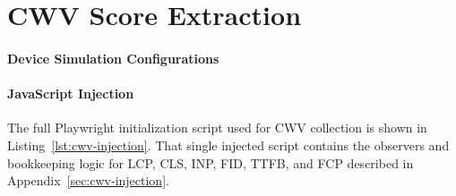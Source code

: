 \section{CWV Score Extraction}
\paragraph{Device Simulation Configurations}

\paragraph{JavaScript Injection}
The full Playwright initialization script used for CWV collection is shown in Listing~\ref{lst:cwv-injection}. That single injected script contains the observers and bookkeeping logic for LCP, CLS, INP, FID, TTFB, and FCP described in Appendix~\ref{sec:cwv-injection}.


